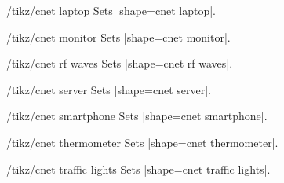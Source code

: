 \documentclass[a4paper]{ltxdoc}
\begin{document}
\begin{stylekey}{/tikz/cnet laptop}
Sets |shape={cnet laptop}|.
\begin{codeexample}[preamble={\usetikzlibrary{shapes.cnet.laptop}}]
\end{codeexample}
\end{stylekey}

\begin{stylekey}{/tikz/cnet monitor}
Sets |shape={cnet monitor}|.
\begin{codeexample}[preamble={\usetikzlibrary{shapes.cnet.monitor}}]
\end{codeexample}
\end{stylekey}

\begin{stylekey}{/tikz/cnet rf waves}
Sets |shape={cnet rf waves}|.
\begin{codeexample}[preamble={\usetikzlibrary{shapes.cnet.rfwaves}}]
\end{codeexample}
\end{stylekey}

\begin{stylekey}{/tikz/cnet server}
Sets |shape={cnet server}|.
\begin{codeexample}[preamble={\usetikzlibrary{shapes.cnet.server}}]
\end{codeexample}
\end{stylekey}

\begin{stylekey}{/tikz/cnet smartphone}
Sets |shape={cnet smartphone}|.
\begin{codeexample}[preamble={\usetikzlibrary{shapes.cnet.smartphone}}]
\end{codeexample}
\end{stylekey}

\begin{stylekey}{/tikz/cnet thermometer}
Sets |shape={cnet thermometer}|.
\begin{codeexample}[preamble={\usetikzlibrary{shapes.cnet.thermometer}}]
\end{codeexample}
\end{stylekey}

\begin{stylekey}{/tikz/cnet traffic lights}
Sets |shape={cnet traffic lights}|.
\begin{codeexample}[preamble={\usetikzlibrary{shapes.cnet.trafficlights}}]
\end{codeexample}
\end{stylekey}
\end{document}
